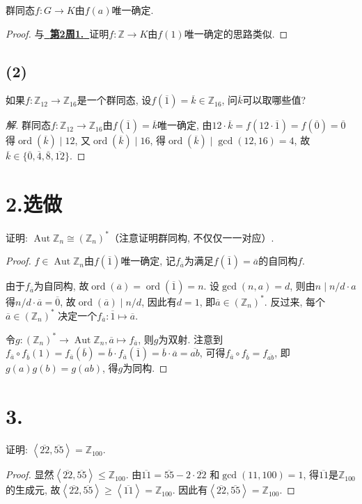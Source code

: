 \documentclass[12pt, a4paper, fontset=windows]{ctexart}
\newcommand{\Z}{\mathbb{Z}}
\newcommand{\Aut}{\operatorname{Aut}}
\newcommand{\cl}[1]{\overline{#1}} %
\newcommand{\gen}[1]{\left\langle{#1}\right\rangle}
\newcommand{\isom}{\cong} %
\newcommand{\kh}[1]{（{#1}）} %
\newcommand{\myref}[2][]{\hyperref[#1]{\bf\color{blue}\ {#2}\ }}
\newcommand{\ord}{\operatorname{ord}}
\newcommand{\xuan}{{\normalsize 选做}}
\newenvironment{solution}{\begin{proof}[解]}{\end{proof}}
\begin{document}
群同态$f:G\to K$由$f(a)$唯一确定. 

\begin{proof}
与\myref[f-with-f(1)]{第2周1.}证明$f:\Z\to K$由$f(1)$唯一确定的思路类似. 
\end{proof}

\subsection*{(2)}

如果$f:\Z_{12}\to\Z_{16}$是一个群同态, 设$f(\cl{1})=\cl{k}\in\Z_{16}$, 
问$\cl{k}$可以取哪些值? 

\begin{solution}
群同态$f:\Z_{12}\to\Z_{16}$由$f(\cl{1})=\cl{k}$唯一确定, 由$12\cdot\cl{k}=f(12\cdot\cl{1})=f(\cl{0})=\cl{0}$
得$\ord(\cl{k})\mid 12$, 又$\ord(\cl{k})\mid 16$, 得$\ord(\cl{k})\mid\gcd(12,16)=4$, 
故$\cl{k}\in\{\cl{0},\cl{4},\cl{8},\cl{12}\}$. 
\end{solution}

\section*{2.\xuan}

证明: $\Aut\Z_n\isom(\Z_n)^*$\kh{注意证明群同构, 不仅仅一一对应}. 

\begin{proof}
$f\in\Aut\Z_n$由$f(\cl{1})$唯一确定, 记$f_{\cl{a}}$为满足$f(\cl{1})=\cl{a}$的自同构$f$. 

由于$f_{\cl{a}}$为自同构, 故$\ord(\cl{a})=\ord(\cl{1})=n$. 设$\gcd(n,a)=d$, 
则由$n\mid n/d\cdot a$得$n/d\cdot\cl{a}=\cl{0}$, 故$\ord(\cl{a})\mid n/d$, 
因此有$d=1$, 即$\cl{a}\in(\Z_n)^*$. 反过来, 每个$\cl{a}\in(\Z_n)^*$
决定一个$f_{\cl{a}}:\cl{1}\mapsto\cl{a}$. 

令$g:(\Z_n)^*\to\Aut\Z_n,\cl{a}\mapsto f_{\cl{a}}$, 则$g$为双射. 
注意到$f_{\cl{a}}\circ f_{\cl{b}}(1)=f_{\cl{a}}(\cl{b})=\cl{b}\cdot f_{\cl{a}}(\cl{1})=\cl{b}\cdot\cl{a}=\cl{ab}$, 
可得$f_{\cl{a}}\circ f_{\cl{b}}=f_{\cl{ab}}$, 即$g(a)g(b)=g(ab)$, 得$g$为同构. 
\end{proof}

\section*{3.}

证明: $\gen{\cl{22},\cl{55}}=\Z_{100}$. 

\begin{proof}
显然$\gen{\cl{22},\cl{55}}\le\Z_{100}$. 由$\cl{11}=\cl{55}-2\cdot\cl{22}$
和$\gcd(11,100)=1$, 得$\cl{11}$是$\Z_{100}$的生成元, 
故$\gen{\cl{22},\cl{55}}\ge\gen{\cl{11}}=\Z_{100}$. 
因此有$\gen{\cl{22},\cl{55}}=\Z_{100}$. 
\end{proof}
\end{document}
